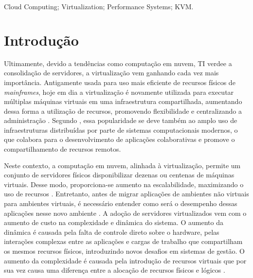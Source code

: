 \documentclass[[10pt,journal]{IEEEtran}
\begin{document}

\begin{IEEEkeywords}
Cloud Computing; Virtualization; Performance Systems; KVM.
\end{IEEEkeywords}






%
\IEEEpeerreviewmaketitle



\section{Introdução}
Ultimamente, devido a tendências como computação em nuvem, TI verde\footnotemark[1] e a consolidação de servidores, a virtualização vem ganhando cada vez mais importância. Antigamente usada para uso mais eficiente de recursos físicos de \textit{mainframes}, hoje em dia a virtualização é novamente utilizada para executar múltiplas máquinas virtuais em uma infraestrutura compartilhada, aumentando dessa forma a utilização de recursos, promovendo flexibilidade e centralizando a administração \cite{huber2011}. Segundo \cite{popiolek2012}, essa popularidade se deve também ao amplo uso de infraestruturas distribuídas por parte de sistemas computacionais modernos, o que colabora para o desenvolvimento de aplicações colaborativas e promove o compartilhamento de recursos remotos.

Neste contexto, a computação em nuvem, alinhada à virtualização, permite um conjunto de servidores físicos disponibilizar dezenas ou centenas de máquinas virtuais. Desse modo, proporciona-se aumento na escalabilidade, maximizando o uso de recursos  \cite{popiolek2012}. Entretanto, antes de migrar aplicações de ambientes não virtuais para ambientes virtuais, é necessário entender como será o desempenho dessas aplicações nesse novo ambiente \cite{benevuto2006}. A adoção de servidores virtualizados vem com o aumento de custo na complexidade e dinâmica do sistema. O aumento da dinâmica é causada pela falta de controle direto sobre o hardware, pelas interações complexas entre as aplicações e cargas de trabalho que compartilham os mesmos recursos físicos, introduzindo novos desafios em sistemas de gestão. O aumento da complexidade é causada pela introdução de recursos virtuais que por sua vez causa uma diferença entre a alocação de recursos físicos e lógicos \cite{huber2011}.
\end{document}
